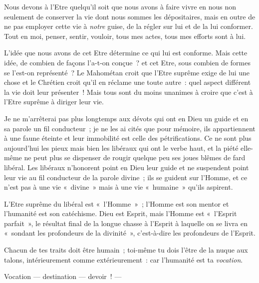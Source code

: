 \documentclass[french,twoside]{book} %
\begin{document}
Nous devons à l’Etre quelqu’il soit que nous avons à faire vivre en nous non seulement de conserver la vie dont nous sommes les dépositaires, mais en outre de ne pas employer cette vie à \emph{notre} guise, de la  régler sur lui et de la lui conformer. Tout en moi, penser, sentir, vouloir, tous mes actes, tous mes efforts sont à lui.\par
L’idée que nous avons de cet Etre détermine ce qui lui est conforme. Mais cette idée, de combien de façons l’a-t-on conçue ? et cet Etre, sous combien de formes se l’est-on représenté ? Le Mahométan croit que l’Etre suprême exige de lui une chose et le Chrétien croit qu’il en réclame une toute autre : quel aspect différent la vie doit leur présenter ! Mais tous sont du moins unanimes à croire que c’est à l’Etre suprême à diriger leur vie.\par
Je ne m’arrêterai pas plus longtemps aux dévots qui ont en Dieu un guide et en sa parole un fil conducteur ; je ne les ai cités que pour mémoire, ils appartiennent à une faune éteinte et leur immobilité est celle des pétrifications. Ce ne sont plus aujourd’hui les pieux mais bien les libéraux qui ont le verbe haut, et la piété elle-même ne peut plus se dispenser de rougir quelque peu ses joues blêmes de fard libéral. Les libéraux n’honorent point en Dieu leur guide et ne suspendent point leur vie au fil conducteur de la parole divine ; ils se guident sur l’Homme, et ce n’est pas à une vie « divine » mais à une vie « humaine » qu’ils aspirent.\par
L’Etre suprême du libéral est « l’Homme » ; l’Homme est son mentor et l’humanité est son catéchisme. Dieu est Esprit, mais l’Homme est « l’Esprit parfait », le résultat final de la longue chasse à l’Esprit à laquelle on se livra en « sondant les profondeurs de la divinité », c’est-à-dire les profondeurs de l’Esprit.\par
Chacun de tes traits doit être humain ; toi-même tu dois l’être de la nuque aux talons, intérieurement comme extérieurement : car l’humanité est ta \emph{vocation}.\par
Vocation — destination — devoir ! —\par
\end{document}
